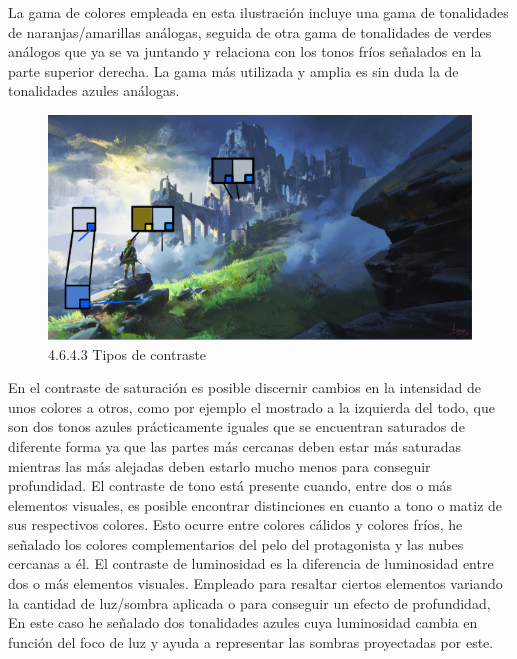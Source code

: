 \documentclass[12pt]{article}
\begin{document}
    La gama de colores empleada en esta ilustración incluye una gama de tonalidades de naranjas/amarillas análogas, seguida de otra gama de tonalidades de verdes análogos que ya se va juntando y relaciona con los tonos fríos señalados en la parte superior derecha. La gama más utilizada y amplia es sin duda la de tonalidades azules análogas.

    \begin{figure}[H]
      \centering
      \includegraphics[scale=0.4]{images/Nerea/Nerea Zelda concept 643.PNG}
      \caption{\small 4.6.4.3 Tipos de contraste}
    \end{figure}

    En el contraste de saturación es posible discernir cambios en la intensidad de unos colores a otros, como por ejemplo el mostrado a la izquierda del todo, que son dos tonos azules prácticamente iguales que se encuentran saturados de diferente forma ya que las partes más cercanas deben estar más saturadas mientras las más alejadas deben estarlo mucho menos para conseguir profundidad. El contraste de tono está presente cuando, entre dos o más elementos visuales, es posible encontrar distinciones en cuanto a tono o matiz de sus respectivos colores. Esto ocurre entre colores cálidos y colores fríos, he señalado los colores complementarios del pelo del protagonista y las nubes cercanas a él. El contraste de luminosidad es la diferencia de luminosidad entre dos o más elementos visuales. Empleado para resaltar ciertos elementos variando la cantidad de luz/sombra aplicada o para conseguir un efecto de profundidad, En este caso he señalado dos tonalidades azules cuya luminosidad cambia en función del foco de luz y ayuda a representar las sombras proyectadas por este.
\end{document}
